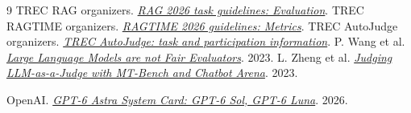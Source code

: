 \documentclass[11pt,letterpaper]{article}
\begin{document}
\begingroup\small\raggedright
\begin{thebibliography}{9}
\setlength{\itemsep}{0pt}
\setlength{\parskip}{0pt}
 TREC RAG organizers. \href{https://github.com/TREC-RAG/trec-rag-skills/blob/main/skills/trec-rag-2026-track-guidelines/references/rag-task.md}{\emph{RAG 2026 task guidelines: Evaluation}}.
 TREC RAGTIME organizers. \href{https://docs.google.com/document/d/1XqypNTHxIdazxfnUebrp-EsUuGNhodhQGrJIDnYGaB4/edit}{\emph{RAGTIME 2026 guidelines: Metrics}}.
\setlength{\itemsep}{0pt}
 TREC AutoJudge organizers. \href{https://trec-auto-judge.cs.unh.edu/}{\emph{TREC AutoJudge: task and participation information}}.
 P. Wang et al. \href{https://arxiv.org/abs/2305.17926}{\emph{Large Language Models are not Fair Evaluators}}. 2023.
 L. Zheng et al. \href{https://arxiv.org/abs/2306.05685}{\emph{Judging LLM-as-a-Judge with MT-Bench and Chatbot Arena}}. 2023.

 OpenAI. \href{https://deploymentsafety.openai.com/gpt-6-astra/sec:appendix-sol-luna}{\emph{GPT-6 Astra System Card: GPT-6 Sol, GPT-6 Luna}}. 2026.
\end{thebibliography}
\endgroup
\end{document}
